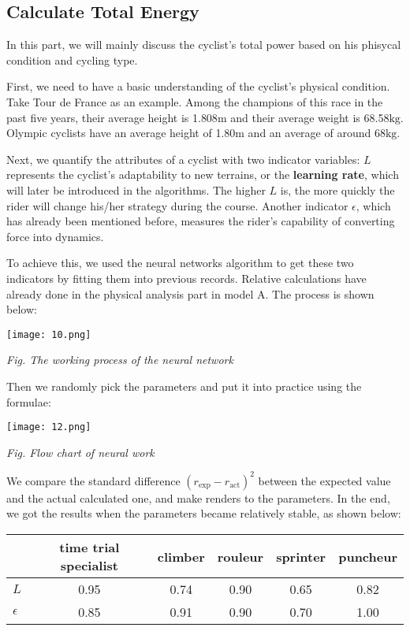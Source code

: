 \documentclass[14pt]{article}
\theoremstyle{definition}
\theoremstyle{remark}
\numberwithin{equation}{section}
\begin{document}
	\subsection{Calculate Total Energy}
	In this part, we will mainly discuss the cyclist's total power based on his phisycal condition and cycling type. 

	First, we need to have a basic understanding of the cyclist's physical condition. Take Tour de France as an example\cite{france}. Among the champions of this race in the past five years, their average height is 1.808$\mathrm{m}$ and their average weight is 68.58$\mathrm{kg}$. Olympic cyclists have an average height of 1.80$\mathrm{m}$ and an average of around 68$\mathrm{kg}$\cite{weight}. 

	Next, we quantify the attributes of a cyclist with two indicator variables: \(L\) represents the cyclist's adaptability to new terrains, or the \textbf{learning rate}, which will later be introduced in the algorithms. The higher \(L\) is, the more quickly the rider will change his/her strategy during the course. Another indicator \(\epsilon\), which has already been mentioned before, measures the rider's capability of converting force into dynamics.

	To achieve this, we used the neural networks algorithm to get these two indicators by fitting them into previous records. Relative calculations have already done in the physical analysis part in model A. The process is shown below:

	\begin{center}
		\texttt{[image: 10.png]}

		\small\textit{Fig. The working process of the neural network}
	\end{center}

	Then we randomly pick the parameters and put it into practice using the formulae:

	\begin{center}
		\texttt{[image: 12.png]}

		\small \textit{Fig. Flow chart of neural work}
	\end{center}

	We compare the standard difference \(\left( r_{\exp}-r_{\mathrm{act}} \right) ^2\) between the expected value and the actual calculated one, and make renders to the parameters. In the end, we got the results when the parameters became relatively stable, as shown below:

			\begin{center}
				\begin{tabular}{|l||c|c|c|c|c|}
					\hline
					&\textbf{time trial specialist} & \textbf{climber} & \textbf{rouleur} & \textbf{sprinter} & \textbf{puncheur} \\
					\hline
					\(L\) & 0.95 & 0.74 & 0.90 & 0.65 & 0.82 \\
					\hline
					\(\epsilon\) & 0.85 & 0.91 & 0.90 & 0.70 & 1.00 \\
					\hline
				\end{tabular}
			\end{center}
\end{document}
